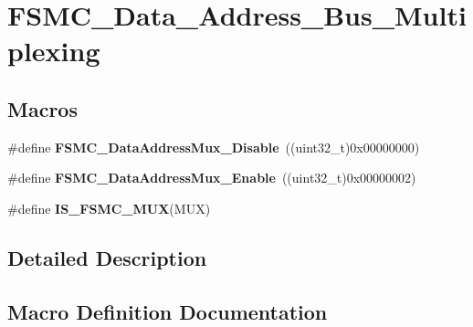 \hypertarget{group___f_s_m_c___data___address___bus___multiplexing}{}\section{F\+S\+M\+C\+\_\+\+Data\+\_\+\+Address\+\_\+\+Bus\+\_\+\+Multiplexing}
\label{group___f_s_m_c___data___address___bus___multiplexing}
\subsection*{Macros}
\begin{DoxyCompactItemize}
\item 
\hypertarget{group___f_s_m_c___data___address___bus___multiplexing_ga62d92adbcbcc1d6ec9a04de1b343744a}{}\#define {\bfseries F\+S\+M\+C\+\_\+\+Data\+Address\+Mux\+\_\+\+Disable}~((uint32\+\_\+t)0x00000000)\label{group___f_s_m_c___data___address___bus___multiplexing_ga62d92adbcbcc1d6ec9a04de1b343744a}

\item 
\hypertarget{group___f_s_m_c___data___address___bus___multiplexing_ga1dd4d12e63aaf29dbb8ae4b613f2aa15}{}\#define {\bfseries F\+S\+M\+C\+\_\+\+Data\+Address\+Mux\+\_\+\+Enable}~((uint32\+\_\+t)0x00000002)\label{group___f_s_m_c___data___address___bus___multiplexing_ga1dd4d12e63aaf29dbb8ae4b613f2aa15}

\item 
\#define {\bfseries I\+S\+\_\+\+F\+S\+M\+C\+\_\+\+M\+U\+X}(M\+U\+X)
\end{DoxyCompactItemize}


\subsection{Detailed Description}


\subsection{Macro Definition Documentation}
\hypertarget{group___f_s_m_c___data___address___bus___multiplexing_ga546fcab8c1b751b4a959ba2ce5b35d79}{}
